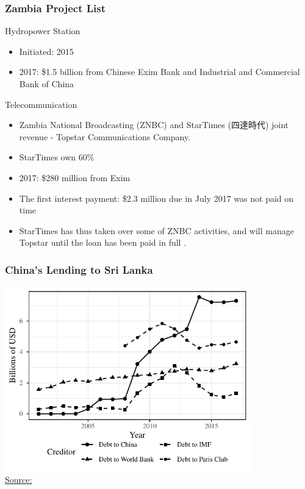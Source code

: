 \documentclass[mathserif]{beamer}
\begin{document}
    \begin{frame}
        \frametitle{Zambia Project List}
        Hydropower Station
        \begin{itemize}
            \item Initiated: 2015
            \item 2017: \$1.5 billion from Chinese Exim Bank and Industrial and Commercial Bank of China
        \end{itemize}
        Telecommunication
        \begin{itemize}
            \item Zambia National Broadcasting (ZNBC) and StarTimes (四達時代) joint revenue - Topstar Communications Company.
            \item StarTimes own 60\%
            \item 2017: \$280 million from Exim
            \item The first interest payment: \$2.3 million due in July 2017 was not paid on time
            \item StarTimes has thus taken over some of ZNBC activities, and will manage Topstar until the loan has been paid in full \citep{ofstad2019zambia}.
        \end{itemize}
    \end{frame}

    \begin{frame}[label = {sri_ts}]
        \frametitle{China's Lending to Sri Lanka}
        \begin{center}
            \includegraphics[width = 0.8\textwidth]{fig/ALL/Sri Lanka_debt_source.pdf}\\
            \small \hyperlink{sri_ds<2>}{Source: }\citet*{Horn-Reinhart-Trebesch-21}
        \end{center}
    \end{frame}
\end{document}

